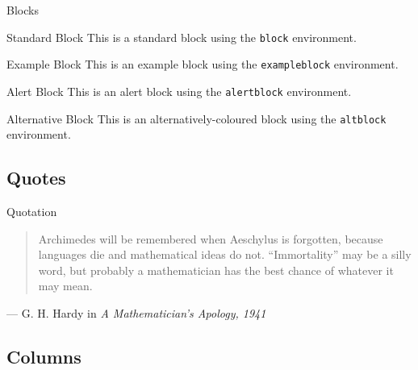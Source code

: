 \documentclass[,aspectratio=43]{beamer}
\begin{document}
\begin{frame}[fragile]{Blocks}
\begin{block}{Standard Block}
\protect\hypertarget{standard-block}{}
This is a standard block using the \texttt{block} environment.
\end{block}

\begin{exampleblock}{Example Block}
This is an example block using the \texttt{exampleblock} environment.

\end{exampleblock}

\begin{alertblock}{Alert Block}
This is an alert block using the \texttt{alertblock} environment.

\end{alertblock}

\begin{altblock}{Alternative Block}
This is an alternatively-coloured block using the \texttt{altblock}
environment.

\end{altblock}
\end{frame}

\hypertarget{quotes}{%
\subsection{Quotes}\label{quotes}}

\begin{frame}{Quotation}
\protect\hypertarget{quotation}{}
\begin{quote}
Archimedes will be remembered when Aeschylus is forgotten, because
languages die and mathematical ideas do not. ``Immortality'' may be a
silly word, but probably a mathematician has the best chance of whatever
it may mean.
\end{quote}

\hfill --- G. H. Hardy in \emph{A Mathematician's Apology, 1941}
\end{frame}

\hypertarget{columns}{%
\subsection{Columns}\label{columns}}
\end{document}
